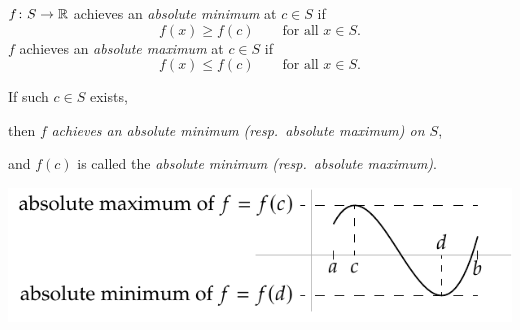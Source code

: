 \documentclass[10pt,aspectratio=169]{beamer}
\begin{document}
\begin{frame}
$f \colon S \to {\mathbb{R}}$ achieves an
\emph{absolute minimum} at $c \in S$ if
\begin{equation*}
f(x) \geq f(c) \qquad \text{for all } x \in S.
\end{equation*}
\pause
$f$ achieves an 
\emph{absolute maximum} at $c \in S$ if
\begin{equation*}
f(x) \leq f(c) \qquad \text{for all } x \in S.
\end{equation*}

\pause
If such $c \in S$ exists,

then 
$f$ \emph{achieves an absolute minimum (resp.\ absolute maximum) on
$S$},

and $f(c)$ is called the \emph{absolute minimum (resp.\ absolute maximum)}.

\pause
\medskip

\begin{center}
\includegraphics{../figures/minmax}
\end{center}
\end{frame}
\end{document}
